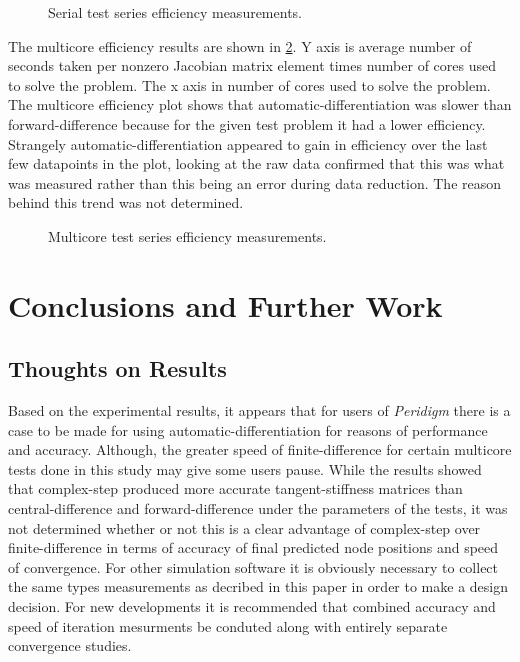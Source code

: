 \documentclass[preprint,12pt]{elsarticle}
\begin{document}
\begin{figure}[tbp]
  \centering
  \scalebox{1.0}{}
  \caption{Serial test series efficiency measurements.}
  \label{fig:serial_efficiency}
\end{figure}

The multicore efficiency results are shown in \ref{fig:multi_efficiency}. Y axis is average number
of seconds taken per nonzero Jacobian matrix element times number of cores used to solve the
problem. The x axis in number of cores used to solve the problem. The multicore efficiency plot
shows that automatic-differentiation was slower than forward-difference because for the given test
problem it had a lower efficiency. Strangely automatic-differentiation appeared to gain in
efficiency over the last few datapoints in the plot, looking at the raw data confirmed that this was
what was measured rather than this being an error during data reduction. The reason behind this
trend was not determined.

\begin{figure}[tbp]
  \centering
  \scalebox{1.0}{}
  \caption{Multicore test series efficiency measurements.}
  \label{fig:multi_efficiency}
\end{figure}

\section{Conclusions and Further Work}

\subsection{Thoughts on Results} Based on the experimental results, it appears that for users of
\emph{Peridigm} there is a case to be made for using automatic-differentiation for reasons of
performance and accuracy. Although, the greater speed of finite-difference for certain multicore
tests done in this study may give some users pause. While the results showed that complex-step
produced more accurate tangent-stiffness matrices than central-difference and forward-difference 
under the parameters of the tests, it was not determined whether or not this is a clear advantage of complex-step over
finite-difference in terms of accuracy of final predicted node positions and speed of convergence. For other
simulation software it is obviously necessary to collect the same types measurements as decribed in
this paper in order to make a design decision. For new developments it is recommended that combined
accuracy and speed of iteration mesurments be conduted along with entirely separate convergence
studies. 
\end{document}
